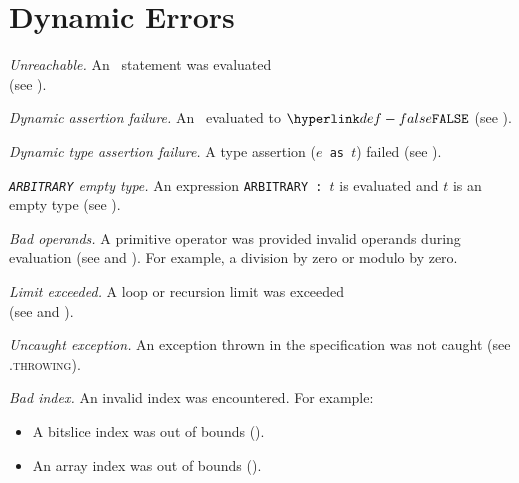 \section{Dynamic Errors\label{sec:DynamicErrors}}
\begin{description}

\hypertarget{def-unreachableerror}{}
\item[$\UnreachableError$]
  \textit{Unreachable.}
  An \unreachablestatementterm\ statement was evaluated\\
    (see ).

\hypertarget{def-dynamicassertionfailure}{}
\item[$\DynamicAssertionFailure$]
  \textit{Dynamic assertion failure.}
  An \assertionstatementterm\ evaluated to $\False$
    (see ).

\hypertarget{def-dynamictypeassertionfailure}{}
\item[$\DynamicTypeAssertionFailure$]
  \textit{Dynamic type assertion failure.}
  A type assertion (\texttt{$e$ as $t$}) failed
    (see ).

\hypertarget{def-arbitraryemptytype}{}
\item[$\ArbitraryEmptyType$]
  \textit{\texttt{ARBITRARY} empty type.}
  An expression \texttt{ARBITRARY : $t$} is evaluated and $t$ is an empty type (see ).

\hypertarget{def-dynamicbadoperands}{}
\item[$\DynamicBadOperands$]
  \textit{Bad operands.}
  A primitive operator was provided invalid operands during evaluation (see  and ).
  For example, a division by zero or modulo by zero.

\hypertarget{def-limitexceeded}{}
\item[$\LimitExceeded$]
  \textit{Limit exceeded.}
  A loop or recursion limit was exceeded \\
  (see  and ).

\hypertarget{def-uncaughtexception}{}
\item[$\UncaughtException$]
  \textit{Uncaught exception.}
  An exception thrown in the specification was not caught (see .\textsc{throwing}).

\hypertarget{def-badindex}{}
\item[$\BadIndex$]
  \textit{Bad index.}
  An invalid index was encountered.
  For example:
  \begin{itemize}
    \item A bitslice index was out of bounds ().
    \item An array index was out of bounds ().
  \end{itemize}


\end{description}
